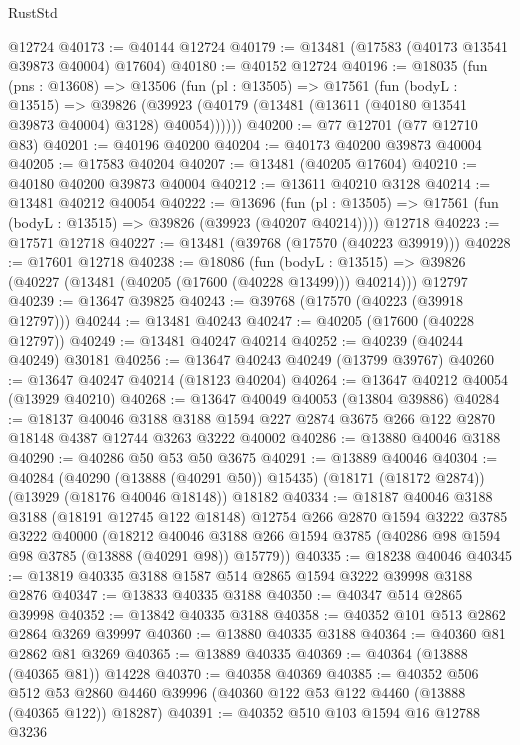 \begin{lexlean}{RustStd}
\begin{coremodule}
    @12724
@40173 := @40144 @12724
@40179 := @13481 (@17583 (@40173 @13541 @39873 @40004) @17604)
@40180 := @40152 @12724
@40196 := @18035
    (fun (pns : @13608) =>
    @13506
      (fun (pl : @13505) =>
      @17561
        (fun (bodyL : @13515) =>
        @39826 (@39923 (@40179 (@13481 (@13611 (@40180 @13541 @39873 @40004) @3128) @40054))))))
@40200 := @77 @12701 (@77 @12710 @83)
@40201 := @40196 @40200
@40204 := @40173 @40200 @39873 @40004
@40205 := @17583 @40204
@40207 := @13481 (@40205 @17604)
@40210 := @40180 @40200 @39873 @40004
@40212 := @13611 @40210 @3128
@40214 := @13481 @40212 @40054
@40222 := @13696
    (fun (pl : @13505) => @17561 (fun (bodyL : @13515) => @39826 (@39923 (@40207 @40214))))
    @12718
@40223 := @17571 @12718
@40227 := @13481 (@39768 (@17570 (@40223 @39919)))
@40228 := @17601 @12718
@40238 := @18086
    (fun (bodyL : @13515) => @39826 (@40227 (@13481 (@40205 (@17600 (@40228 @13499))) @40214)))
    @12797
@40239 := @13647 @39825
@40243 := @39768 (@17570 (@40223 (@39918 @12797)))
@40244 := @13481 @40243
@40247 := @40205 (@17600 (@40228 @12797))
@40249 := @13481 @40247 @40214
@40252 := @40239 (@40244 @40249) @30181
@40256 := @13647 @40243 @40249 (@13799 @39767)
@40260 := @13647 @40247 @40214 (@18123 @40204)
@40264 := @13647 @40212 @40054 (@13929 @40210)
@40268 := @13647 @40049 @40053 (@13804 @39886)
@40284 := @18137
    @40046
    @3188
    @3188
    @1594
    @227
    @2874
    @3675
    @266
    @122
    @2870
    @18148
    @4387
    @12744
    @3263
    @3222
    @40002
@40286 := @13880 @40046 @3188
@40290 := @40286 @50 @53 @50 @3675
@40291 := @13889 @40046
@40304 := @40284
    (@40290 (@13888 (@40291 @50)) @15435)
    (@18171 (@18172 @2874))
    (@13929 (@18176 @40046 @18148))
    @18182
@40334 := @18187
    @40046
    @3188
    @3188
    (@18191 @12745 @122 @18148)
    @12754
    @266
    @2870
    @1594
    @3222
    @3785
    @3222
    @40000
    (@18212 @40046 @3188 @266 @1594 @3785 (@40286 @98 @1594 @98 @3785 (@13888 (@40291 @98)) @15779))
@40335 := @18238 @40046
@40345 := @13819 @40335 @3188 @1587 @514 @2865 @1594 @3222 @39998 @3188 @2876
@40347 := @13833 @40335 @3188
@40350 := @40347 @514 @2865 @39998
@40352 := @13842 @40335 @3188
@40358 := @40352 @101 @513 @2862 @2864 @3269 @39997
@40360 := @13880 @40335 @3188
@40364 := @40360 @81 @2862 @81 @3269
@40365 := @13889 @40335
@40369 := @40364 (@13888 (@40365 @81)) @14228
@40370 := @40358 @40369
@40385 := @40352
    @506
    @512
    @53
    @2860
    @4460
    @39996
    (@40360 @122 @53 @122 @4460 (@13888 (@40365 @122)) @18287)
@40391 := @40352 @510 @103 @1594 @16 @12788 @3236

\end{coremodule}
\end{lexlean}
